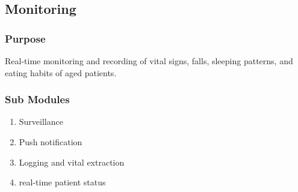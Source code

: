\subsection{Monitoring}
\subsubsection{Purpose}
Real-time monitoring and recording of vital signs, falls, sleeping patterns, and eating habits of aged patients.
\subsubsection{Sub Modules}
\begin{enumerate}
    \item Surveillance
    \item Push notification
    \item Logging and vital extraction
    \item real-time patient status
\end{enumerate}

